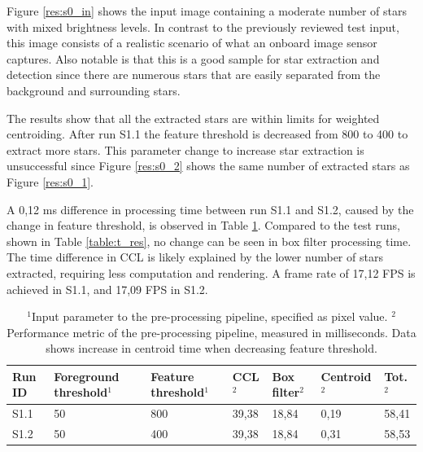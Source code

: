 \documentclass[12pt]{report}
\begin{document}
Figure \ref{res:s0_in} shows the input image containing a moderate number of stars with mixed brightness levels. In contrast to the previously reviewed test input, this image consists of a realistic scenario of what an onboard image sensor captures. Also notable is that this is a good sample for star extraction and detection since there are numerous stars that are easily separated from the background and surrounding stars.
\par
The results show that all the extracted stars are within limits for weighted centroiding. After run S1.1 the feature threshold is decreased from 800 to 400 to extract more stars. This parameter change to increase star extraction is unsuccessful since Figure \ref{res:s0_2} shows the same number of extracted stars as Figure \ref{res:s0_1}.  
\par
A 0,12 ms difference in processing time between run S1.1 and S1.2, caused by the change in feature threshold, is observed in Table \ref{table:s0_res}. Compared to the test runs, shown in Table \ref{table:t_res}, no change can be seen in box filter processing time. The time difference in CCL is likely explained by the lower number of stars extracted, requiring less computation and rendering.
A frame rate of 17,12 FPS is achieved in S1.1, and 17,09 FPS in S1.2.
\begin{table}[!h]
    \centering
    \begin{tabular}{|p{0.8cm}|p{2.5cm}|p{2cm}||p{1.25cm}|p{1.25cm}|p{1.9cm}|p{1cm}|}
        \hline
        \textbf{Run ID}&\textbf{Foreground threshold$^{1}$}&\textbf{Feature threshold$^{1}$}&\textbf{CCL$^{2}$}&\textbf{Box filter$^{2}$}&\textbf{Centroid$^{2}$}&\textbf{Tot.$^{2}$}\\
        \hline
        \hline
        S1.1&50&800&39,38&18,84&0,19&58,41\\
        \hline
        S1.2&50&400&39,38&18,84&0,31&58,53\\
        \hline
    \end{tabular}
    \caption{$^{1}$Input parameter to the pre-processing pipeline, specified as pixel value. $^{2}$Performance metric of the pre-processing pipeline, measured in milliseconds. Data shows increase in centroid time when decreasing feature threshold.}
    \label{table:s0_res}
\end{table}
\end{document}
